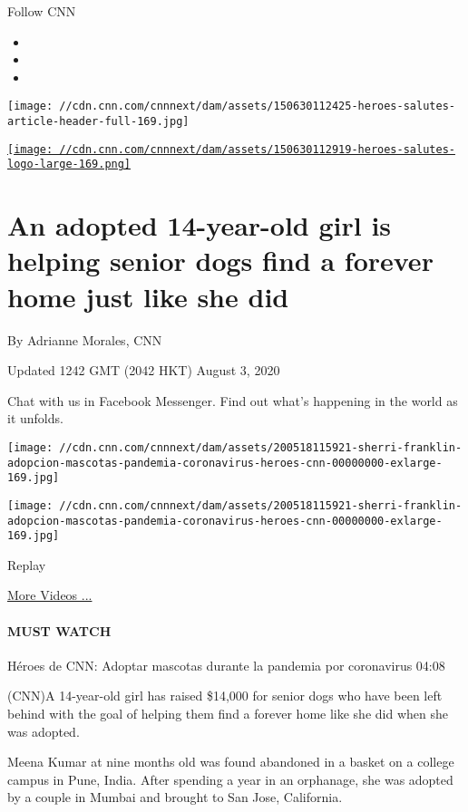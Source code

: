 Follow CNN

\begin{itemize}
\item
\item
\item
\end{itemize}

\texttt{[image: //cdn.cnn.com/cnnnext/dam/assets/150630112425-heroes-salutes-article-header-full-169.jpg]}

\href{/specials/cnn-heroes}{\texttt{[image: //cdn.cnn.com/cnnnext/dam/assets/150630112919-heroes-salutes-logo-large-169.png]}}

\hypertarget{an-adopted-14-year-old-girl-is-helping-senior-dogs-find-a-forever-home-just-like-she-did}{%
\section{An adopted 14-year-old girl is helping senior dogs find a
forever home just like she
did}\label{an-adopted-14-year-old-girl-is-helping-senior-dogs-find-a-forever-home-just-like-she-did}}

By Adrianne Morales, CNN

Updated 1242 GMT (2042 HKT) August 3, 2020

Chat with us in Facebook Messenger. Find out what's happening in the
world as it unfolds.

\texttt{[image: //cdn.cnn.com/cnnnext/dam/assets/200518115921-sherri-franklin-adopcion-mascotas-pandemia-coronavirus-heroes-cnn-00000000-exlarge-169.jpg]}

\texttt{[image: //cdn.cnn.com/cnnnext/dam/assets/200518115921-sherri-franklin-adopcion-mascotas-pandemia-coronavirus-heroes-cnn-00000000-exlarge-169.jpg]}\href{javascript:void(0);}{}

Replay

\href{/videos}{More Videos ...}

\hypertarget{must-watch}{%
\paragraph{MUST WATCH}\label{must-watch}}

Héroes de CNN: Adoptar mascotas durante la pandemia por coronavirus
04:08

(CNN)A 14-year-old girl has raised \$14,000 for senior dogs who have
been left behind with the goal of helping them find a forever home like
she did when she was adopted.

Meena Kumar at nine months old was found abandoned in a basket on a
college campus in Pune, India. After spending a year in an orphanage,
she was adopted by a couple in Mumbai and brought to San Jose,
California.

